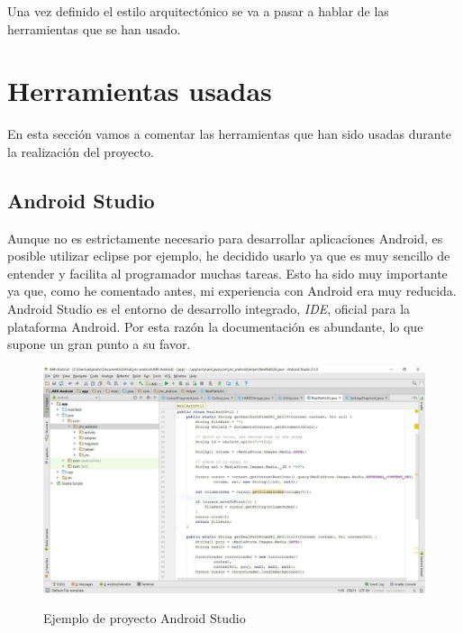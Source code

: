 Una vez definido el estilo arquitectónico se va a pasar a hablar de las herramientas que se han usado.

\section{Herramientas usadas}

En esta sección vamos a comentar las herramientas que han sido usadas durante la realización del proyecto.

\subsection{Android Studio}

Aunque no es estrictamente necesario para desarrollar aplicaciones Android, es posible utilizar eclipse por ejemplo, he decidido usarlo ya que es muy sencillo de entender y facilita al programador muchas tareas. Esto ha sido muy importante ya que, como he comentado antes, mi experiencia con Android era muy reducida.\\

Android Studio es el entorno de desarrollo integrado, \textit{IDE}, oficial para la plataforma Android. Por esta razón la documentación es abundante, lo que supone un gran punto a su favor.\\

\begin{figure}[H] %
\centering
\includegraphics[scale=0.5]{imagenes/android-studio.jpg}  %
\label{android-studio.jpg}
\caption{Ejemplo de proyecto Android Studio}
\end{figure}

